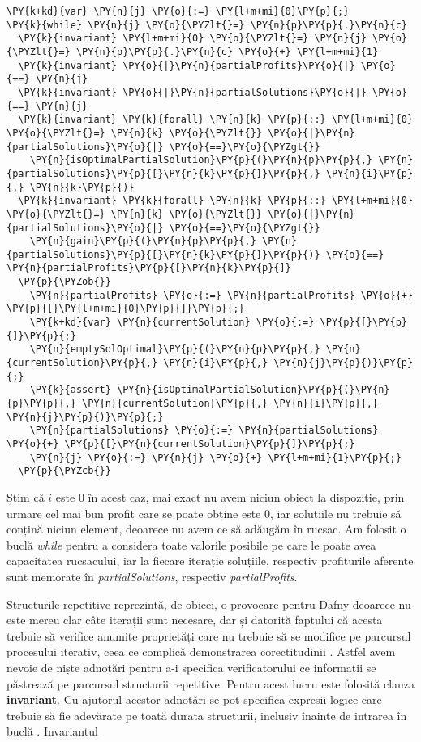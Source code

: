 \begin{sloppypar}
\begin{Verbatim}[commandchars=\\\{\}]
\PY{k+kd}{var} \PY{n}{j} \PY{o}{:=} \PY{l+m+mi}{0}\PY{p}{;}
\PY{k}{while} \PY{n}{j} \PY{o}{\PYZlt{}=} \PY{n}{p}\PY{p}{.}\PY{n}{c}
  \PY{k}{invariant} \PY{l+m+mi}{0} \PY{o}{\PYZlt{}=} \PY{n}{j} \PY{o}{\PYZlt{}=} \PY{n}{p}\PY{p}{.}\PY{n}{c} \PY{o}{+} \PY{l+m+mi}{1}
  \PY{k}{invariant} \PY{o}{|}\PY{n}{partialProfits}\PY{o}{|} \PY{o}{==} \PY{n}{j}
  \PY{k}{invariant} \PY{o}{|}\PY{n}{partialSolutions}\PY{o}{|} \PY{o}{==} \PY{n}{j}
  \PY{k}{invariant} \PY{k}{forall} \PY{n}{k} \PY{p}{::} \PY{l+m+mi}{0} \PY{o}{\PYZlt{}=} \PY{n}{k} \PY{o}{\PYZlt{}} \PY{o}{|}\PY{n}{partialSolutions}\PY{o}{|} \PY{o}{==}\PY{o}{\PYZgt{}} 
    \PY{n}{isOptimalPartialSolution}\PY{p}{(}\PY{n}{p}\PY{p}{,} \PY{n}{partialSolutions}\PY{p}{[}\PY{n}{k}\PY{p}{]}\PY{p}{,} \PY{n}{i}\PY{p}{,} \PY{n}{k}\PY{p}{)}
  \PY{k}{invariant} \PY{k}{forall} \PY{n}{k} \PY{p}{::} \PY{l+m+mi}{0} \PY{o}{\PYZlt{}=} \PY{n}{k} \PY{o}{\PYZlt{}} \PY{o}{|}\PY{n}{partialSolutions}\PY{o}{|} \PY{o}{==}\PY{o}{\PYZgt{}} 
    \PY{n}{gain}\PY{p}{(}\PY{n}{p}\PY{p}{,} \PY{n}{partialSolutions}\PY{p}{[}\PY{n}{k}\PY{p}{]}\PY{p}{)} \PY{o}{==} \PY{n}{partialProfits}\PY{p}{[}\PY{n}{k}\PY{p}{]}
  \PY{p}{\PYZob{}}
    \PY{n}{partialProfits} \PY{o}{:=} \PY{n}{partialProfits} \PY{o}{+} \PY{p}{[}\PY{l+m+mi}{0}\PY{p}{]}\PY{p}{;}
    \PY{k+kd}{var} \PY{n}{currentSolution} \PY{o}{:=} \PY{p}{[}\PY{p}{]}\PY{p}{;}
    \PY{n}{emptySolOptimal}\PY{p}{(}\PY{n}{p}\PY{p}{,} \PY{n}{currentSolution}\PY{p}{,} \PY{n}{i}\PY{p}{,} \PY{n}{j}\PY{p}{)}\PY{p}{;}
    \PY{k}{assert} \PY{n}{isOptimalPartialSolution}\PY{p}{(}\PY{n}{p}\PY{p}{,} \PY{n}{currentSolution}\PY{p}{,} \PY{n}{i}\PY{p}{,} \PY{n}{j}\PY{p}{)}\PY{p}{;}
    \PY{n}{partialSolutions} \PY{o}{:=} \PY{n}{partialSolutions} \PY{o}{+} \PY{p}{[}\PY{n}{currentSolution}\PY{p}{]}\PY{p}{;}
    \PY{n}{j} \PY{o}{:=} \PY{n}{j} \PY{o}{+} \PY{l+m+mi}{1}\PY{p}{;}
  \PY{p}{\PYZcb{}}
\end{Verbatim}
    \par Știm că $i$ este 0 în acest caz, mai exact nu avem niciun obiect la dispoziție, prin urmare cel mai bun profit care se poate obține este 0, iar soluțiile nu trebuie să conțină niciun element, deoarece nu avem ce să adăugăm în rucsac. Am folosit o buclă \textit{while} pentru a considera toate valorile posibile pe care le poate avea capacitatea rucsacului, iar la fiecare iterație soluțiile, respectiv profiturile aferente sunt memorate în \textit{partialSolutions}, respectiv \textit{partialProfits}. \par
    Structurile repetitive reprezintă, de obicei, o provocare pentru Dafny deoarece nu este mereu clar câte iterații sunt necesare, dar și datorită faptului că acesta trebuie să verifice anumite proprietăți care nu trebuie să se modifice pe parcursul procesului iterativ, ceea ce complică demonstrarea corectitudinii \cite{DBLP:series/natosec/KoenigL12}. Astfel avem nevoie de niște adnotări pentru a-i specifica verificatorului ce informații se păstrează pe parcursul structurii repetitive. Pentru acest lucru este folosită clauza \textbf{invariant}. Cu ajutorul acestor adnotări se pot specifica expresii logice care trebuie să fie adevărate pe toată durata structurii, inclusiv înainte de intrarea în buclă \cite{DBLP:series/natosec/KoenigL12}. Invariantul

\end{sloppypar}
